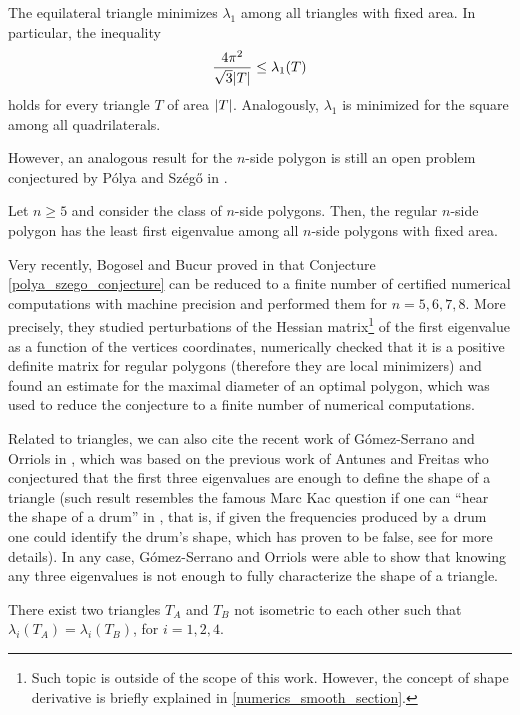 \begin{theorem}
    The equilateral triangle minimizes \(\lambda_1\) among all triangles with fixed area. In particular, the inequality
    \[
    \frac{4 \pi^2}{\sqrt{3}\abs{T}} \leq  \lambda_1(T)
    \]
    holds for every triangle \(T\) of area \(\abs{T}\). Analogously, \(\lambda_1\) is minimized for the square among all quadrilaterals.
\end{theorem}

However, an analogous result for the \(n\)-side polygon is still an open problem conjectured by Pólya and Szég\H{o} in \cite{polya1951isoperimetric}.
\begin{conjecture}\label{polya_szego_conjecture}
    Let \(n \geq 5\) and consider the class of \(n\)-side polygons. Then, the regular \(n\)-side polygon has the least first eigenvalue among all \(n\)-side polygons with fixed area.
\end{conjecture}

Very recently, Bogosel and Bucur proved in \cite{bogosel2022polygonal} that Conjecture \eqref{polya_szego_conjecture} can be reduced to a finite number of certified numerical computations with machine precision and performed them for \(n=5, 6, 7, 8\). More precisely, they studied perturbations of the Hessian matrix\footnote{Such topic is outside of the scope of this work. However, the concept of shape derivative is briefly explained in \ref{numerics_smooth_section}.} of the first eigenvalue as a function of the vertices coordinates, numerically checked that it is a positive definite matrix for regular polygons (therefore they are local minimizers) and found an estimate for the maximal diameter of an optimal polygon, which was used to reduce the conjecture to a finite number of numerical computations.

Related to triangles, we can also cite the recent work of Gómez-Serrano and Orriols in \cite{gomez2021any}, which was based on the previous work of Antunes and Freitas \cite{antunes2011inverse} who conjectured that the first three eigenvalues are enough to define the shape of a triangle (such result resembles the famous Marc Kac question if one can ``hear the shape of a drum'' in \cite{kac1966can}, that is, if given the frequencies produced by a drum one could identify the drum's shape, which has proven to be false, see \cite{gordon1992isospectral} for more details). In any case, Gómez-Serrano and Orriols were able to show that knowing any three eigenvalues is not enough to fully characterize the shape of a triangle.
\begin{theorem}
    There exist two triangles \(T_A\) and \(T_B\) not isometric to each other such that \(\lambda_i(T_A) = \lambda_i(T_B)\), for \(i=1, 2, 4\).
\end{theorem}

